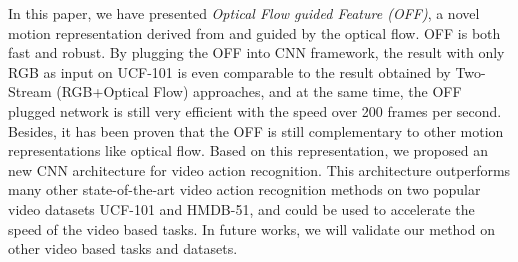 \documentclass[10pt,twocolumn,letterpaper]{article}
\begin{document}
In this paper, we have presented \textit{Optical Flow guided Feature (OFF)}, a novel motion representation derived from and guided by the optical flow. OFF is both fast and robust. By plugging the OFF into CNN framework, the result with only RGB as input on UCF-101 is even comparable to the result obtained by Two-Stream (RGB+Optical Flow) approaches, and at the same time, the OFF plugged network is still very efficient with the speed over 200 frames per second. Besides, it has been proven that the OFF is still complementary to other motion representations like optical flow. Based on this representation, we proposed an new CNN architecture for video action recognition. This architecture outperforms many other state-of-the-art video action recognition methods on two popular video datasets UCF-101 and HMDB-51, and could be used to accelerate the speed of the video based tasks. In future works, we will validate our method on other video based tasks and datasets.




{\small


}
\end{document}
